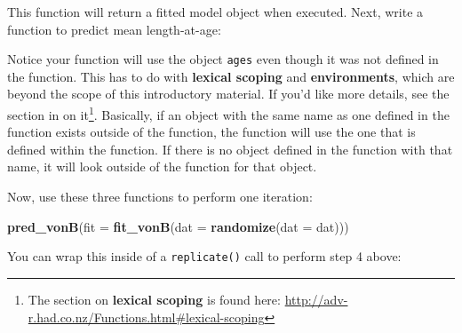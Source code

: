 \documentclass[]{book}
\newenvironment{Shaded}{\begin{snugshade}}{\end{snugshade}}
\newcommand{\CommentTok}[1]{\textcolor[rgb]{0.56,0.35,0.01}{\textit{#1}}}
\newcommand{\ControlFlowTok}[1]{\textcolor[rgb]{0.13,0.29,0.53}{\textbf{#1}}}
\newcommand{\DataTypeTok}[1]{\textcolor[rgb]{0.13,0.29,0.53}{#1}}
\newcommand{\DecValTok}[1]{\textcolor[rgb]{0.00,0.00,0.81}{#1}}
\newcommand{\KeywordTok}[1]{\textcolor[rgb]{0.13,0.29,0.53}{\textbf{#1}}}
\newcommand{\NormalTok}[1]{#1}
\newcommand{\OperatorTok}[1]{\textcolor[rgb]{0.81,0.36,0.00}{\textbf{#1}}}
\newcommand{\StringTok}[1]{\textcolor[rgb]{0.31,0.60,0.02}{#1}}
\let\rmarkdownfootnote\footnote%
\def\footnote{\protect\rmarkdownfootnote}
\begin{document}
This function will return a fitted model object when executed. Next, write a function to predict mean length-at-age:

\begin{Shaded}
\end{Shaded}

Notice your function will use the object \texttt{ages} even though it was not defined in the function. This has to do with \textbf{lexical scoping} and \textbf{environments}, which are beyond the scope of this introductory material. If you'd like more details, see the section in \citet{adv-r-cite} on it\footnote{The section on \textbf{lexical scoping} is found here: \url{http://adv-r.had.co.nz/Functions.html\#lexical-scoping}}. Basically, if an object with the same name as one defined in the function exists outside of the function, the function will use the one that is defined within the function. If there is no object defined in the function with that name, it will look outside of the function for that object.

Now, use these three functions to perform one iteration:

\begin{Shaded}
\begin{Highlighting}[]
\KeywordTok{pred_vonB}\NormalTok{(}\DataTypeTok{fit =} \KeywordTok{fit_vonB}\NormalTok{(}\DataTypeTok{dat =} \KeywordTok{randomize}\NormalTok{(}\DataTypeTok{dat =}\NormalTok{ dat)))}
\end{Highlighting}
\end{Shaded}

You can wrap this inside of a \texttt{replicate()} call to perform step 4 above:
\end{document}
